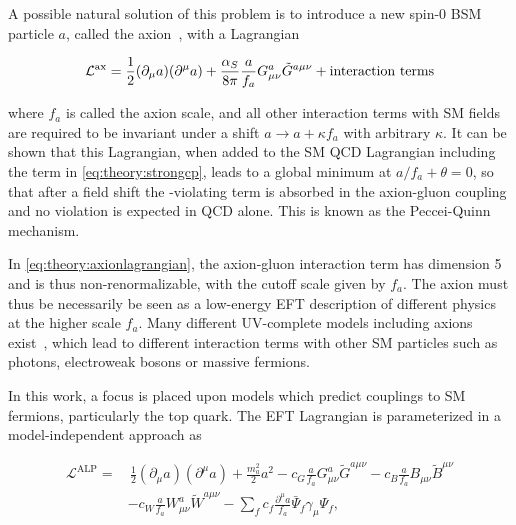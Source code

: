 A possible natural solution of this problem is to introduce a new spin-0 BSM particle $a$, called the axion~\cite{Weinberg:1977ma,Wilczek:1977pj}, with a Lagrangian~\cite{DiLuzio:2020wdo}

\begin{equation}
\label{eq:theory:axionlagrangian}
    \mathcal{L}^{\mathrm{ax}} = \frac{1}{2} (\partial_\mu a) (\partial^\mu a) + \frac{\alpha_S}{8 \pi} \frac{a}{f_a} G^{a}_{\mu \nu} \tilde{G}^{a \mu \nu} + \text{interaction terms}
\end{equation}

\noindent where $f_a$ is called the axion scale, and all other interaction terms with SM fields are required to be invariant under a shift $a \rightarrow a + \kappa f_a$ with arbitrary $\kappa$. It can be shown that this Lagrangian, when added to the SM QCD Lagrangian including the term in \cref{eq:theory:strongcp}, leads to a global minimum at $a/f_a + \theta = 0$, so that after a field shift the \CP-violating term is absorbed in the axion-gluon coupling and no \CP violation is expected in QCD alone. This is known as the Peccei-Quinn mechanism.

In \cref{eq:theory:axionlagrangian}, the axion-gluon interaction term has dimension 5 and is thus non-renormalizable, with the cutoff scale given by $f_a$. The axion must thus be necessarily be seen as a low-energy EFT description of different physics at the higher scale $f_a$. Many different UV-complete models including axions exist~\cite{DiLuzio:2020wdo,Kim:1979if,Shifman:1979if,Dine:1981rt,Zhitnitsky:1980tq}, which lead to different interaction terms with other SM particles such as photons, electroweak bosons or massive fermions.

In this work, a focus is placed upon models which predict couplings to SM fermions, particularly the top quark. The EFT Lagrangian is parameterized in a model-independent approach as~\cite{Georgi:1986df}

\begin{equation}
\begin{split}
\label{eq:theory:alplagrangian}
    \mathcal{L}^{\mathrm{ALP}} =& \, \frac{1}{2} (\partial_\mu a) (\partial^\mu a)
    + \frac{m_a^2}{2} a^2
    - c_G \frac{a}{f_a} G^{a}_{\mu \nu} \tilde{G}^{a \mu \nu}
    - c_B \frac{a}{f_a} B_{\mu \nu} \tilde{B}^{\mu \nu} \\
    & - c_W \frac{a}{f_a} W^{a}_{\mu \nu} \tilde{W}^{a \mu \nu}
    - \sum_f c_f \frac{\partial^\mu a}{f_a} \bar{\Psi}_f \gamma_\mu \Psi_f ,
\end{split}
\end{equation}

